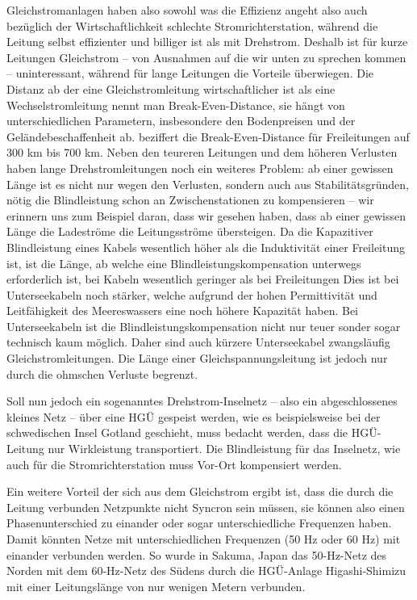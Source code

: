 Gleichstromanlagen haben also sowohl was die Effizienz angeht also auch bezüglich der Wirtschaftlichkeit schlechte  Stromrichterstation, während die Leitung selbst effizienter und billiger ist als mit Drehstrom. Deshalb ist für kurze Leitungen Gleichstrom -- von Ausnahmen auf die wir unten zu sprechen kommen -- uninteressant, während für lange Leitungen die Vorteile überwiegen. Die Distanz ab der eine Gleichstromleitung wirtschaftlicher ist als eine Wechselstromleitung nennt man Break-Even-Distance, sie hängt von unterschiedlichen Parametern, insbesondere den Bodenpreisen und der Geländebeschaffenheit ab. %
\cite{Schymroch} beziffert die Break-Even-Distance für Freileitungen auf 300 km bis 700 km. %
Neben den teureren Leitungen und dem höheren Verlusten haben lange Drehstromleitungen noch ein weiteres Problem: ab einer gewissen Länge ist es nicht nur wegen den Verlusten, sondern auch aus Stabilitätsgründen, nötig die Blindleistung schon an Zwischenstationen zu kompensieren -- wir erinnern uns zum Beispiel daran, dass wir gesehen haben, dass ab einer gewissen Länge die Ladeströme die Leitungsströme übersteigen. Da die Kapazitiver Blindleistung eines Kabels wesentlich höher als die Induktivität einer Freileitung ist, ist die Länge, ab welche eine Blindleistungskompensation unterwegs erforderlich ist, bei Kabeln wesentlich geringer als bei Freileitungen %
Dies ist bei Unterseekabeln noch stärker, welche aufgrund der hohen Permittivität und Leitfähigkeit des Meereswassers eine noch höhere Kapazität haben. Bei Unterseekabeln ist die Blindleistungskompensation nicht nur teuer sonder sogar technisch kaum möglich. Daher sind auch kürzere Unterseekabel zwangsläufig Gleichstromleitungen. %
Die Länge einer Gleichspannungsleitung ist jedoch nur durch die ohmschen Verluste begrenzt.\cite{Schymroch}

Soll nun jedoch ein sogenanntes Drehstrom-Inselnetz -- also ein abgeschlossenes kleines Netz -- über eine HGÜ gespeist werden, wie es beispielsweise bei der schwedischen Insel Gotland geschieht, muss bedacht werden, dass die HGÜ-Leitung nur Wirkleistung transportiert. Die Blindleistung für das Inselnetz, wie auch für die Stromrichterstation muss Vor-Ort kompensiert werden.

Ein weitere Vorteil der sich aus dem Gleichstrom ergibt ist, dass die durch die Leitung verbunden Netzpunkte nicht Syncron sein müssen, sie können also einen Phasenunterschied zu einander oder sogar unterschiedliche Frequenzen haben. Damit könnten Netze mit unterschiedlichen Frequenzen (50 Hz oder 60 Hz) mit einander verbunden werden. So wurde in Sakuma, Japan das 50-Hz-Netz des Norden mit dem 60-Hz-Netz des Südens durch die HGÜ-Anlage Higashi-Shimizu mit einer Leitungslänge von nur wenigen Metern verbunden.\cite{Schymroch} %

